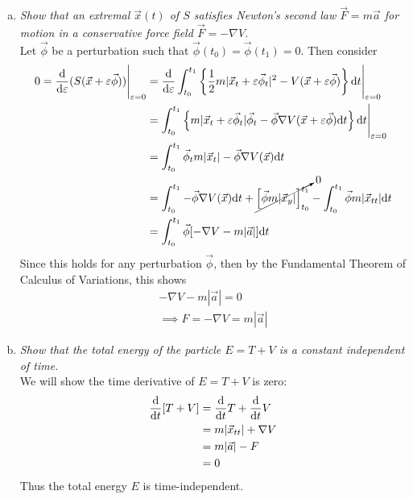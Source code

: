 \documentclass[12pt]{article}
\theoremstyle{plain}
\newcommand{\E}{\varepsilon}
\begin{document}
\begin{enumerate}[(a)]
    \item \emph{Show that an extremal $\vec{x}(t)$ of $S$ satisfies Newton's second law $\vec{F} = m\vec{a}$ for motion in a conservative force field $\vec{F} = -\nabla V$.} \\

    Let $\vec{\phi}$ be a perturbation such that $\vec{\phi}(t_0) = \vec{\phi}(t_1) = 0$.  Then consider
    \begin{align*}
        0 = \frac{\dd}{\dd \E}(S(\vec{x} + \E\vec{\phi}))\Bigg|_{\E= 0} &= \frac{\dd}{\dd \E}\int_{t_0}^{t_1} \left\{\frac{1}{2}m|\vec{x}_t + \E\vec{\phi}_t|^2 - V(\vec{x} + \E\vec{\phi})\right\}\dd t\Bigg|_{\E= 0} \\
        &= \int_{t_0}^{t_1}\left\{m|\vec{x}_t + \E\vec{\phi}_t|\vec{\phi}_t - \vec{\phi}\nabla V(\vec{x} + \E\vec{\phi}) \dd t\right\}\dd t \Bigg|_{\E= 0} \\
        &= \int_{t_0}^{t_1} \vec{\phi}_t m|\vec{x}_t| - \vec{\phi}\nabla V(\vec{x})\dd t \\
        &= \int_{t_0}^{t_1}-\vec{\phi}\nabla V(\vec{x})\dd t + \cancelto{0}{\qty[\vec{\phi} m |\vec{x}_y|]_{t_0}^{t_1}} - \int_{t_0}^{t_1}\vec{\phi} m|\vec{x}_{tt}|\dd t \\
        &= \int_{t_0}^{t_1}\vec{\phi}\qty[-\nabla V - m|\vec{a}|]\dd t \\
    \end{align*}
    Since this holds for any perturbation $\vec{\phi}$, then by the Fundamental Theorem of Calculus of Variations, this shows
    \begin{align*}
        -\nabla V - m|\vec{a}| = 0 \\
        \implies F = -\nabla V = m|\vec{a}|
    \end{align*}
    \item \emph{Show that the total energy of the particle $E = T + V$ is a constant independent of time.} \\
    
    We will show the time derivative of $E = T + V$ is zero:
    \begin{align*}
        \frac{\dd}{\dd t} \qty[T + V] &= \frac{\dd}{\dd t}T + \frac{\dd}{\dd t}V \\
        &= m|\vec{x}_{tt}| + \nabla V \\
        &= m|\vec{a}| - F \\
        &= 0
    \end{align*}
    Thus the total energy $E$ is time-independent.
\end{enumerate}
\end{document}
